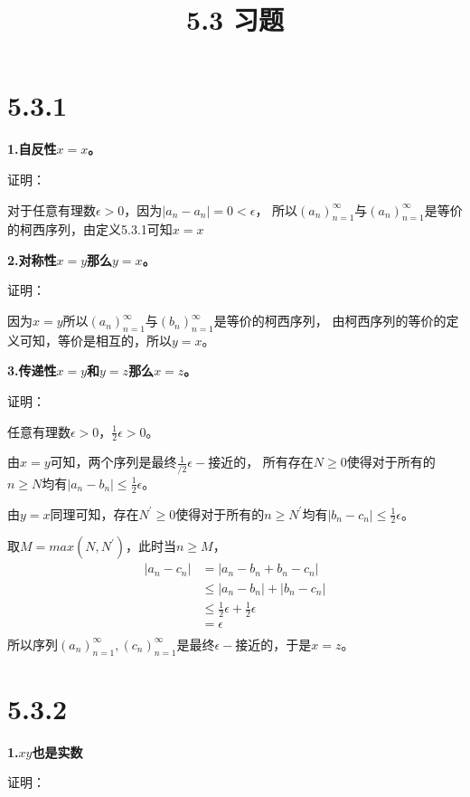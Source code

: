 \documentclass{article}
\theoremstyle{mystyle}
\begin{document}
\title{5.3 习题}
\maketitle

\section*{5.3.1}

\textbf{1.自反性$x=x$。}

证明：

对于任意有理数$\epsilon > 0$，因为$|a_n - a_n| = 0 < \epsilon $，
所以$(a_n)_{n=1}^\infty$与$(a_n)_{n=1}^\infty$是等价的柯西序列，由定义5.3.1可知$x=x$

\textbf{2.对称性$x=y$那么$y=x$。}

证明：

因为$x=y$所以$(a_n)_{n=1}^\infty$与$(b_n)_{n=1}^\infty$是等价的柯西序列，
由柯西序列的等价的定义可知，等价是相互的，所以$y = x$。

\textbf{3.传递性$x=y$和$y=z$那么$x=z$。}

证明：

任意有理数$\epsilon > 0$，$\frac{1}{2}\epsilon > 0$。

由$x=y$可知，两个序列是最终$\frac{1}{/2}\epsilon -$接近的，
所有存在$N \geq 0$使得对于所有的$n \geq N$均有$|a_n - b_n| \leq \frac{1}{2}\epsilon$。

由$y=x$同理可知，存在$N^\prime \geq 0$使得对于所有的$n \geq N^\prime$均有$|b_n - c_n| \leq \frac{1}{2}\epsilon$。

取$M=max(N,N^\prime)$，此时当$n \geq M$，
\begin{align*}
  |a_n - c_n| & = |a_n - b_n + b_n - c_n|                      \\
              & \leq |a_n - b_n| + |b_n - c_n|                 \\
              & \leq \frac{1}{2}\epsilon + \frac{1}{2}\epsilon \\
              & = \epsilon                                     \\
\end{align*}
所以序列$(a_n)_{n=1}^\infty,(c_n)_{n=1}^\infty$是最终$\epsilon -$接近的，于是$x=z$。

\section*{5.3.2}

\textbf{1.$xy$也是实数}

证明：
\end{document}
